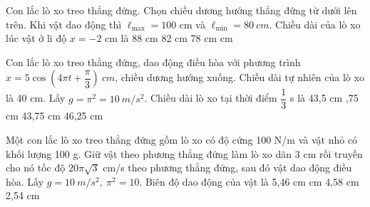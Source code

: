 \begin{ex}%
Con lắc lò xo treo thẳng đứng. Chọn chiều dương hướng thẳng đứng từ dưới lên trên. Khi vật dao động thì $\ell_{\max} = 100$ cm và $\ell_{\min} = 80\ cm$. Chiều dài của lò xo lúc vật ở li độ $x = -2$ cm là
\choice
{88 cm}
{82 cm}
{78 cm}
{ cm}
\end{ex} 
\begin{ex}%
Con lắc lò xo treo thẳng đứng, dao động điều hòa với phương trình $x=5\cos  \left( 4\pi t+\dfrac{\pi}{3} \right)\ cm$, chiều dương hướng xuống. Chiều dài tự nhiên của lò xo là 40 cm. Lấy $g =\pi^2= 10\ m/s^2$. Chiều dài lò xo tại thời điểm $\dfrac{1}{3}$ s là
\choice
{43,5 cm}
{,75 cm}
{43,75 cm}
{46,25 cm}
\end{ex} 
\begin{ex}%
Một con lắc lò xo treo thẳng đứng gồm lò xo có độ cứng 100 N/m và vật nhỏ có khối lượng 100 g. Giữ vật theo phương thẳng đứng làm lò xo dãn 3 cm rồi truyền cho nó tốc độ $20\pi \sqrt{3}$ cm/s theo phương thẳng đứng, sau đó vật dao động điều hòa. Lấy $g = 10\ m/s^2,\ \pi^2=10$. Biên độ dao động của vật là
\choice
{5,46 cm}
{ cm}
{4,58 cm}
{2,54 cm}
\end{ex} 


